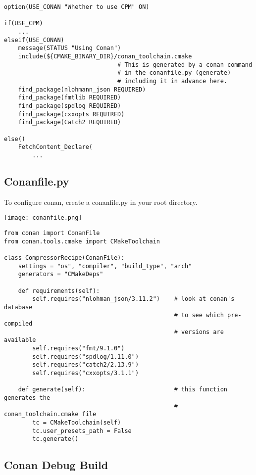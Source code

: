 \documentclass[openany]{report}
\begin{document}
\begin{verbatim}
option(USE_CONAN "Whether to use CPM" ON)

if(USE_CPM)
    ...
elseif(USE_CONAN)
    message(STATUS "Using Conan")
    include(${CMAKE_BINARY_DIR}/conan_toolchain.cmake  
                                # This is generated by a conan command
                                # in the conanfile.py (generate)
                                # including it in advance here.
    find_package(nlohmann_json REQUIRED)
    find_package(fmtlib REQUIRED)
    find_package(spdlog REQUIRED)
    find_package(cxxopts REQUIRED)
    find_package(Catch2 REQUIRED)

else()
    FetchContent_Declare(
        ...
\end{verbatim}

\subsection{Conanfile.py}

To configure conan, create a conanfile.py in your root directory.

\begin{center}
    \texttt{[image: conanfile.png]}
\end{center}

\begin{verbatim}
from conan import ConanFile
from conan.tools.cmake import CMakeToolchain

class CompressorRecipe(ConanFile):
    settings = "os", "compiler", "build_type", "arch"
    generators = "CMakeDeps"

    def requirements(self):
        self.requires("nlohman_json/3.11.2")    # look at conan's database
                                                # to see which pre-compiled
                                                # versions are available
        self.requires("fmt/9.1.0")
        self.requires("spdlog/1.11.0")
        self.requires("catch2/2.13.9")
        self.requires("cxxopts/3.1.1")

    def generate(self):                         # this function generates the
                                                # conan_toolchain.cmake file
        tc = CMakeToolchain(self)
        tc.user_presets_path = False
        tc.generate()
\end{verbatim}

\subsection{Conan Debug Build}
\end{document}

